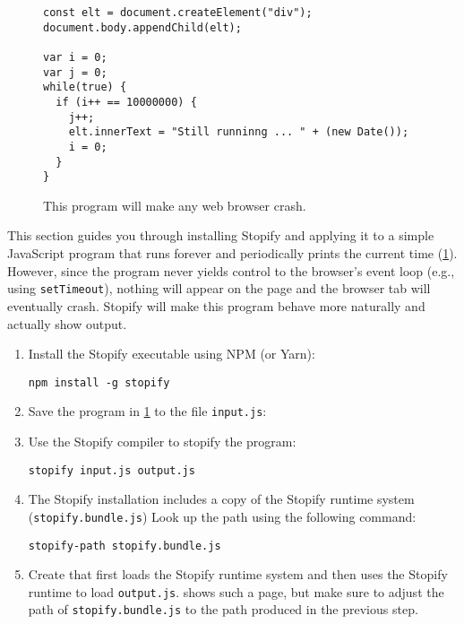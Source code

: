 \documentclass{book}
\begin{document}
\begin{figure}
\lstset{language=js}
\begin{lstlisting}
const elt = document.createElement("div");
document.body.appendChild(elt);

var i = 0;
var j = 0;
while(true) {
  if (i++ == 10000000) {
    j++;
    elt.innerText = "Still runninng ... " + (new Date());
    i = 0;
  }
}
\end{lstlisting}
\caption{This program will make any web browser crash.\label{trivial-periodic}}
\end{figure}

This section guides you through installing Stopify and applying it to a simple
JavaScript program that runs forever and periodically prints the current time
(\cref{trivial-periodic}). However, since the program never yields
control to the browser's event loop (e.g., using \texttt{setTimeout}), nothing
will appear on the page and the browser tab will eventually crash. Stopify will
make this program behave more naturally and actually show output.

\begin{enumerate}

\item Install the Stopify executable using NPM (or Yarn):
\lstset{language=console}
\begin{lstlisting}
npm install -g stopify
\end{lstlisting}

\item Save the program in \cref{trivial-periodic} to the file
 \texttt{input.js}:


\item Use the Stopify compiler to stopify the program:

\lstset{language=console}
\begin{lstlisting}
stopify input.js output.js
\end{lstlisting}

\item The Stopify installation includes a copy of the Stopify runtime system
(\texttt{stopify.bundle.js})
Look up the path using the following command:

\lstset{language=console}
\begin{lstlisting}
stopify-path stopify.bundle.js
\end{lstlisting}


\item Create
that first loads the Stopify runtime system and then uses the Stopify runtime
to load \texttt{output.js}.  shows such a page, but
make sure to adjust the path of \texttt{stopify.bundle.js} to the path
produced in the previous step.

\end{enumerate}
\end{document}
